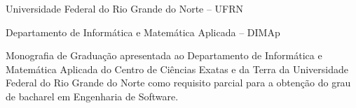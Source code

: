 
\instituicao
{
	Universidade Federal do Rio Grande do Norte -- UFRN \par
	Departamento de Informática e Matemática Aplicada -- DIMAp
}

\comentario
{
	Monografia de Graduação apresentada ao Departamento de Informática e Matemática Aplicada do
	Centro de Ciências Exatas e da Terra da Universidade Federal do Rio Grande do Norte como
	requisito parcial para a obtenção do grau de bacharel em Engenharia de Software.
}


\folhaderosto